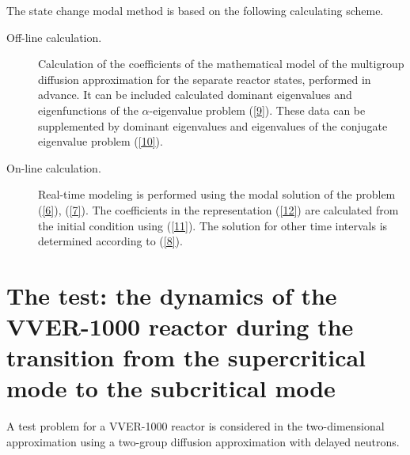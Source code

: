 \documentclass[a4paper]{jpconf}
\begin{document}
The state change modal method is based on the following calculating scheme.
\begin{description}
 \item[Off-line calculation.] Calculation of the coefficients of the mathematical model of the multigroup diffusion approximation for the separate reactor states, performed in advance. It can be included calculated dominant eigenvalues and eigenfunctions of the  $\alpha$-eigenvalue problem (\ref{9}). 
These data can be supplemented by dominant eigenvalues and eigenvalues of the conjugate eigenvalue problem (\ref{10}).
 \item[On-line calculation.] Real-time modeling is performed using the modal solution of the problem  (\ref{6}), (\ref{7}).
The coefficients in the representation  (\ref{12}) are calculated from the initial condition using (\ref{11}). The solution for other time intervals is determined according to (\ref{8}).
\end{description}  

\section{The test: the dynamics of the VVER-1000 reactor during the transition from the supercritical mode to the subcritical mode} 

A test problem for a VVER-1000 reactor \cite{chao} 
is considered in the two-dimensional approximation using a two-group diffusion approximation with delayed neutrons. 
\end{document}
